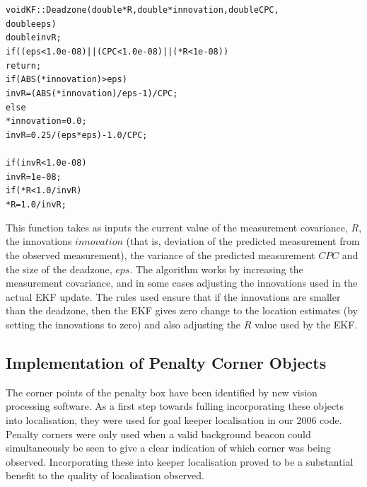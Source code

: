 \begin{alltt}
void KF::Deadzone(double* R, double* innovation, double CPC,
double eps) { 
  double invR;
  if ((eps<1.0e-08) || (CPC<1.0e-08) || (*R<1e-08))
  	return;
	if (ABS(*innovation)>eps) {
    invR=(ABS(*innovation)/eps-1)/CPC;
  } else {
    *innovation=0.0;
    invR=0.25/(eps*eps)-1.0/CPC;
  }
  if (invR<1.0e-08)
    invR=1e-08;
  if ( *R < 1.0/invR )
    *R=1.0/invR;
}
\end{alltt}

This function takes as inputs the current value of the measurement
covariance, $R$, the innovations $innovation$ (that is, deviation of
the predicted measurement from the observed measurement), the
variance of the predicted measurement $CPC$ and the size of the
deadzone, $eps$. The algorithm works by increasing the measurement
covariance, and in some cases adjusting the innovations used in the
actual EKF update. The rules used ensure that if the innovations are
smaller than the deadzone, then the EKF gives zero change to the
location estimates (by setting the innovations to zero) and also
adjusting the $R$ value used by the EKF.

\subsection{Implementation of Penalty Corner Objects}

The corner points of the penalty box have been identified by new
vision processing software. As a first step towards fulling
incorporating these objects into localisation, they were used for
goal keeper localisation in our 2006 code. Penalty corners were only
used when a valid background beacon could simultaneously be seen to
give a clear indication of which corner was being observed.
Incorporating these into keeper localisation proved to be a
substantial benefit to the quality of localisation observed.

